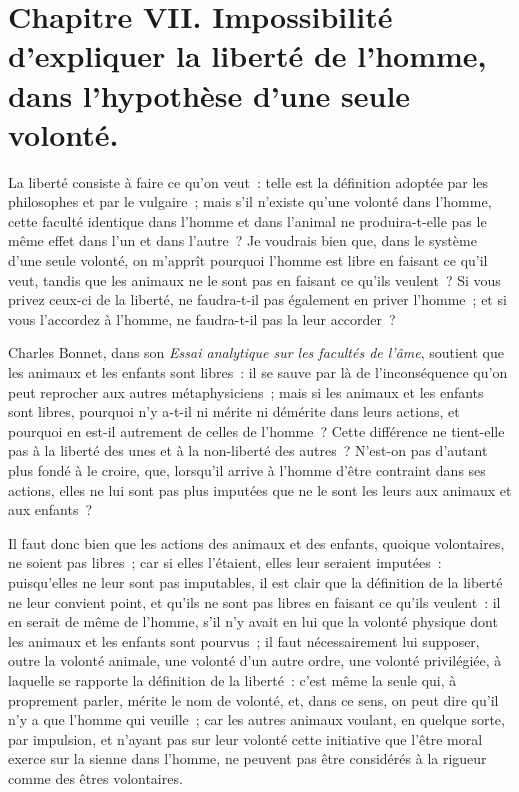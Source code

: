 \documentclass[french,twoside]{book} %
\newcommand\chapteropen{} %
\newcommand\chaptercont{} %
\begin{document}
\chapteropen
\chapter[{Chapitre VII. Impossibilité d’expliquer la liberté de l’homme, dans l’hypothèse d’une seule volonté.}]{Chapitre VII. Impossibilité d’expliquer la liberté de l’homme, dans l’hypothèse d’une seule volonté.}\renewcommand{\leftmark}{Chapitre VII. Impossibilité d’expliquer la liberté de l’homme, dans l’hypothèse d’une seule volonté.}


\chaptercont
\noindent La liberté consiste à faire ce qu’on veut : telle est la définition adoptée par les philosophes et par le vulgaire ; mais s’il n’existe qu’une volonté dans l’homme, cette faculté identique dans l’homme et dans l’animal ne produira-t-elle pas le même effet dans l’un et dans l’autre ? Je voudrais bien que, dans le système d’une seule volonté, on m’apprît pourquoi l’homme est libre en faisant ce qu’il veut, tandis que les animaux ne le sont pas en faisant ce qu’ils veulent ? Si vous privez ceux-ci de la liberté, ne faudra-t-il pas également en priver l’homme ; et si vous l’accordez à l’homme, ne faudra-t-il pas la leur accorder ?\par
Charles Bonnet, dans son {\itshape Essai analytique sur les facultés de l’âme}, soutient que les animaux et les enfants sont libres : il se sauve par là de l’inconséquence qu’on peut reprocher aux autres métaphysiciens ; mais si les animaux et les enfants sont libres, pourquoi n’y a-t-il ni mérite ni démérite dans leurs actions, et pourquoi en est-il autrement de celles de l’homme ? Cette différence ne tient-elle pas à la liberté des unes et à la non-liberté des autres ? N’est-on pas d’autant plus fondé à le croire, que, lorsqu’il arrive à l’homme d’être contraint dans ses actions, elles ne lui sont pas plus imputées que ne le sont les leurs aux animaux et aux enfants ?\par
Il faut donc bien que les actions des animaux et des enfants, quoique volontaires, ne soient pas libres ; car si elles l’étaient, elles leur seraient imputées : puisqu’elles ne leur sont pas imputables, il est clair que la définition de la liberté ne leur convient point, et qu’ils ne sont pas libres en faisant ce qu’ils veulent : il en serait de même de l’homme, s’il n’y avait en lui que la volonté physique dont les animaux et les enfants sont pourvus ; il faut nécessairement lui supposer, outre la volonté animale, une volonté d’un autre ordre, une volonté privilégiée, à laquelle se rapporte la définition de la liberté : c’est même la seule qui, à proprement parler, mérite le nom de volonté, et, dans ce sens, on peut dire qu’il n’y a que l’homme qui veuille ; car les autres animaux voulant, en quelque sorte, par impulsion, et n’ayant pas sur leur volonté cette initiative que l’être moral exerce sur la sienne dans l’homme, ne peuvent pas être considérés à la rigueur comme des êtres volontaires.\par
\end{document}
